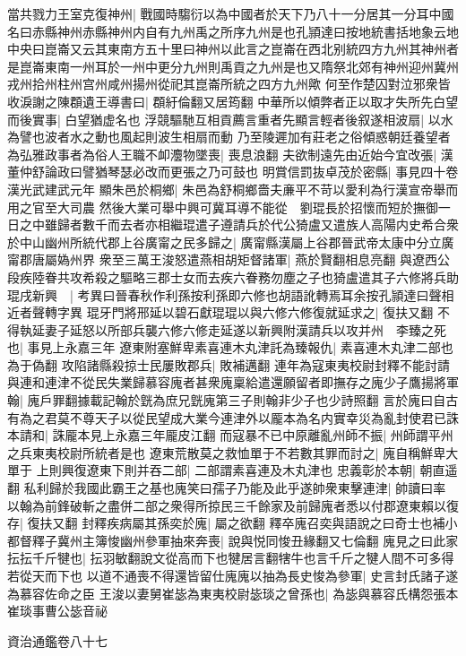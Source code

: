 當共戮力王室克復神州|{
	戰國時騶衍以為中國者於天下乃八十一分居其一分耳中國名曰赤縣神州赤縣神州内自有九州禹之所序九州是也孔頴達曰按地統書括地象云地中央曰崑崙又云其東南方五十里曰神州以此言之崑崙在西北别統四方九州其神州者是崑崙東南一州耳於一州中更分九州則禹貢之九州是也又隋祭北郊有神州迎州冀州戎州拾州柱州宫州咸州揚州從祀其崑崙所統之四方九州歟}
何至作楚囚對泣邪衆皆收淚謝之陳頵遺王導書曰|{
	頵紆倫翻又居筠翻}
中華所以傾弊者正以取才失所先白望而後實事|{
	白望猶虚名也}
浮競驅馳互相貢薦言重者先顯言輕者後叙遂相波扇|{
	以水為譬也波者水之動也風起則波生相扇而動}
乃至陵遲加有莊老之俗傾惑朝廷養望者為弘雅政事者為俗人王職不卹灋物墜喪|{
	喪息浪翻}
夫欲制遠先由近始今宜改張|{
	漢董仲舒論政曰譬猶琴瑟必改而更張之乃可鼓也}
明賞信罰抜卓茂於密縣|{
	事見四十卷漢光武建武元年}
顯朱邑於桐鄉|{
	朱邑為舒桐鄉嗇夫亷平不苛以愛利為行漢宣帝舉而用之官至大司農}
然後大業可舉中興可冀耳導不能從　劉琨長於招懷而短於撫御一日之中雖歸者數千而去者亦相繼琨遣子遵請兵於代公猗盧又遣族人高陽内史希合衆於中山幽州所統代郡上谷廣甯之民多歸之|{
	廣甯縣漢屬上谷郡晉武帝太康中分立廣甯郡唐屬媯州界}
衆至三萬王浚怒遣燕相胡矩督諸軍|{
	燕於賢翻相息亮翻}
與遼西公段疾陸眷共攻希殺之驅略三郡士女而去疾六眷務勿塵之子也猗盧遣其子六修將兵助琨戌新興　|{
	考異曰晉春秋作利孫按利孫即六修也胡語訛轉焉耳余按孔頴達曰聲相近者聲轉字異}
琨牙門將邢延以碧石獻琨琨以與六修六修復就延求之|{
	復扶又翻}
不得執延妻子延怒以所部兵襲六修六修走延遂以新興附漢請兵以攻并州　李臻之死也|{
	事見上永嘉三年}
遼東附塞鮮卑素喜連木丸津託為臻報仇|{
	素喜連木丸津二部也為于偽翻}
攻陷諸縣殺掠士民屢敗郡兵|{
	敗補邁翻}
連年為寇東夷校尉封釋不能討請與連和連津不從民失業歸慕容廆者甚衆廆稟給遣還願留者即撫存之廆少子鷹揚將軍翰|{
	廆戶罪翻據載記翰於皝為庶兄皝廆第三子則翰非少子也少詩照翻}
言於廆曰自古有為之君莫不尊天子以從民望成大業今連津外以龎本為名内實幸災為亂封使君已誅本請和|{
	誅龎本見上永嘉三年龎皮江翻}
而寇暴不已中原離亂州師不振|{
	州師謂平州之兵東夷校尉所統者是也}
遼東荒散莫之救恤單于不若數其罪而討之|{
	廆自稱鮮卑大單于}
上則興復遼東下則并吞二部|{
	二部謂素喜連及木丸津也}
忠義彰於本朝|{
	朝直遥翻}
私利歸於我國此霸王之基也廆笑曰孺子乃能及此乎遂帥衆東擊連津|{
	帥讀曰率}
以翰為前鋒破斬之盡併二部之衆得所掠民三千餘家及前歸廆者悉以付郡遼東賴以復存|{
	復扶又翻}
封釋疾病屬其孫奕於廆|{
	屬之欲翻}
釋卒廆召奕與語說之曰奇士也補小都督釋子冀州主簿悛幽州參軍抽來奔喪|{
	說與悦同悛丑緣翻又七倫翻}
廆見之曰此家抎抎千斤犍也|{
	抎羽敏翻說文從高而下也犍居言翻犗牛也言千斤之犍人間不可多得若從天而下也}
以道不通喪不得還皆留仕廆廆以抽為長史悛為參軍|{
	史言封氏諸子遂為慕容佐命之臣}
王浚以妻舅崔毖為東夷校尉毖琰之曾孫也|{
	為毖與慕容氏構怨張本崔琰事曹公毖音祕}


資治通鑑卷八十七
